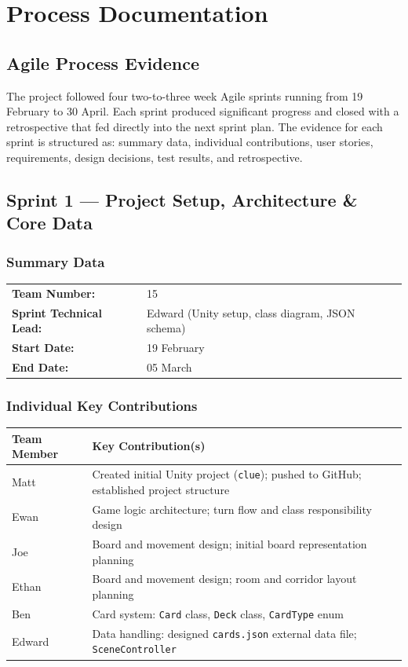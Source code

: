 \chapter{Process Documentation}
\label{chap:process}

\section{Agile Process Evidence}

The project followed four two-to-three week Agile sprints running from 19 February to 30 April.
Each sprint produced significant progress and closed with a retrospective that fed directly into the next sprint plan.
The evidence for each sprint is structured as: summary data, individual contributions, user stories, requirements, design decisions, test results, and retrospective.

\section{Sprint 1 --- Project Setup, Architecture \& Core Data}
\label{sec:sprint1}

\subsection*{Summary Data}
\begin{tabular}{ll}
\textbf{Team Number:} & 15 \\
\textbf{Sprint Technical Lead:} & Edward (Unity setup, class diagram, JSON schema) \\
\textbf{Start Date:} & 19 February \\
\textbf{End Date:} & 05 March \\
\end{tabular}

\subsection*{Individual Key Contributions}

\begin{table}[H]
\centering
\small
\footnotesize
\begin{tabular}{|p{1.8cm}|p{7.2cm}|}
\hline
\textbf{Team Member} & \textbf{Key Contribution(s)} \\ \hline
Matt & Created initial Unity project (\texttt{clue}); pushed to GitHub; established project structure \\ \hline
Ewan & Game logic architecture; turn flow and class responsibility design \\ \hline
Joe & Board and movement design; initial board representation planning \\ \hline
Ethan & Board and movement design; room and corridor layout planning \\ \hline
Ben & Card system: \texttt{Card} class, \texttt{Deck} class, \texttt{CardType} enum \\ \hline
Edward & Data handling: designed \texttt{cards.json} external data file; \texttt{SceneController} \\ \hline
\end{tabular}
\end{table}


